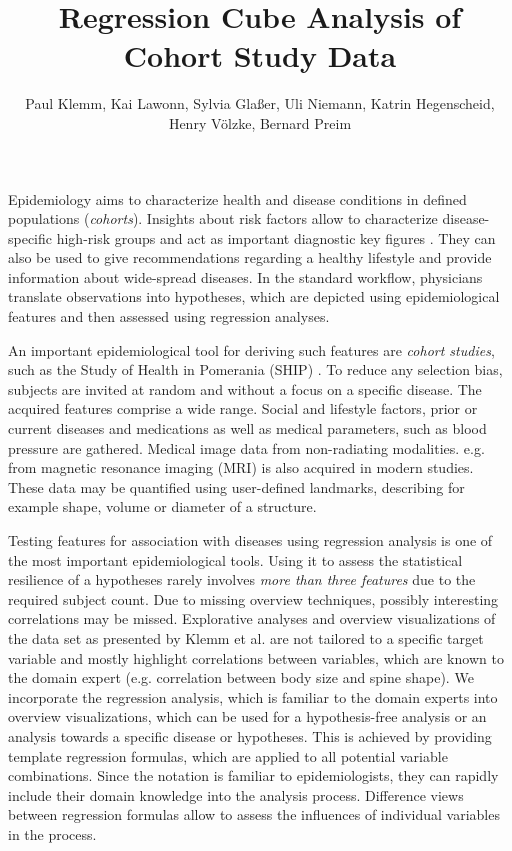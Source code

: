 \documentclass[journal]{style/vgtc} 			          %
\title{Regression Cube Analysis of Cohort Study Data}
\author{Paul Klemm, Kai Lawonn, Sylvia Gla{\ss}er, Uli Niemann, Katrin Hegenscheid, Henry V{\"o}lzke, Bernard Preim}
\begin{document}


\maketitle
Epidemiology aims to characterize health and disease conditions in defined populations (\emph{cohorts}).
Insights about risk factors allow to characterize disease-specific high-risk groups and act as important diagnostic key figures \cite{Fletcher2012}.
They can also be used to give recommendations regarding a healthy lifestyle and provide information about wide-spread diseases.
In the standard workflow, physicians translate observations into hypotheses, which are depicted using epidemiological features and then assessed using regression analyses.

An important epidemiological tool for deriving such features are \emph{cohort studies}, such as the Study of Health in Pomerania (SHIP) \cite{Volzke2011}.
To reduce any selection bias, subjects are invited at random and without a focus on a specific disease.
The acquired features comprise a wide range.
%
Social and lifestyle factors, prior or current diseases and medications as well as medical parameters, such as blood pressure are gathered.
Medical image data from non-radiating modalities. e.g. from magnetic resonance imaging (MRI) is also acquired in modern studies.
These data may be quantified using user-defined landmarks, describing for example shape, volume or diameter of a structure.

Testing features for association with diseases using regression analysis is one of the most important epidemiological tools.
Using it to assess the statistical resilience of a hypotheses rarely involves \emph{more than three features} due to the required subject count.
Due to missing overview techniques, possibly interesting correlations may be missed.
Explorative analyses and overview visualizations of the data set as presented by Klemm et al. \cite{Klemm2014VIS} are not tailored to a specific target variable and mostly highlight correlations between variables, which are known to the domain expert (e.g. correlation between body size and spine shape).
We incorporate the regression analysis, which is familiar to the domain experts into overview visualizations, which can be used for a hypothesis-free analysis or an analysis towards a specific disease or hypotheses.
This is achieved by providing template regression formulas, which are applied to all potential variable combinations.
Since the notation is familiar to epidemiologists, they can rapidly include their domain knowledge into the analysis process.
Difference views between regression formulas allow to assess the influences of individual variables in the process.
\end{document}
